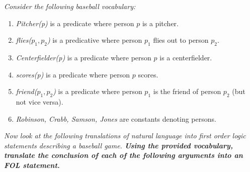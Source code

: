 \textit{Consider the following baseball vocabulary:}

\begin{enumerate}
    \item \textit{Pitcher(p)} is a predicate where person $p$ is a pitcher.
    \item \textit{flies($ p_1, p_2 $)} is a predicative where person $p_1$ flies out to person $p_2$.
    \item \textit{Centerfielder(p)} is a predicate where person $p$ is a centerfielder.
    \item \textit{scores(p)} is a predicate where person $p$ scores.
    \item \textit{friend($p_1, p_2$)} is a predicate where person $p_1$ is the friend of person $p_2$ (but not vice versa).
    \item \textit{Robinson, Crabb, Samson, Jones} are constants denoting persons.
\end{enumerate}

\textit{Now look at the following translations of natural language into first order logic statements describing
a baseball game. \textbf{Using the provided vocabulary, translate the conclusion of each of the
following arguments into an FOL statement.}}

